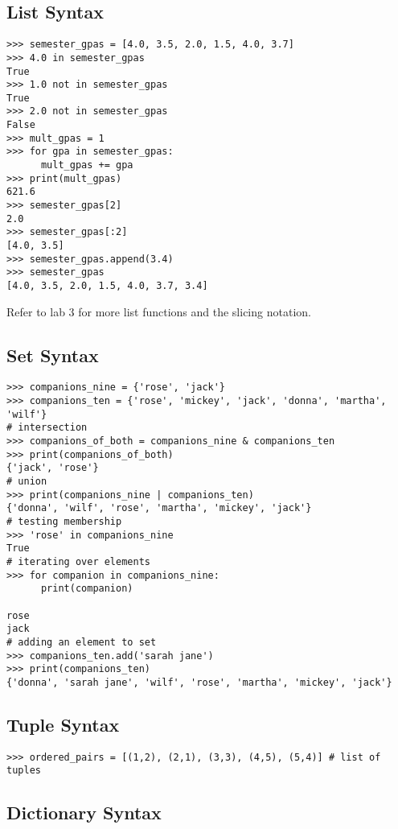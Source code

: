 \documentclass[11pt]{cselabheader}
\begin{document}
\subsection{List Syntax}

\begin{lstlisting}[style=ipython]
>>> semester_gpas = [4.0, 3.5, 2.0, 1.5, 4.0, 3.7]
>>> 4.0 in semester_gpas
True
>>> 1.0 not in semester_gpas
True
>>> 2.0 not in semester_gpas
False
>>> mult_gpas = 1
>>> for gpa in semester_gpas:
      mult_gpas += gpa
>>> print(mult_gpas)
621.6
>>> semester_gpas[2]
2.0
>>> semester_gpas[:2]
[4.0, 3.5]
>>> semester_gpas.append(3.4)
>>> semester_gpas
[4.0, 3.5, 2.0, 1.5, 4.0, 3.7, 3.4]
\end{lstlisting}

Refer to lab 3 for more list functions and the slicing notation.

\subsection{Set Syntax}

\begin{lstlisting}[style=ipython]
>>> companions_nine = {'rose', 'jack'}
>>> companions_ten = {'rose', 'mickey', 'jack', 'donna', 'martha', 'wilf'}
# intersection
>>> companions_of_both = companions_nine & companions_ten
>>> print(companions_of_both)
{'jack', 'rose'}
# union
>>> print(companions_nine | companions_ten)
{'donna', 'wilf', 'rose', 'martha', 'mickey', 'jack'}
# testing membership
>>> 'rose' in companions_nine
True
# iterating over elements
>>> for companion in companions_nine:
      print(companion)

rose
jack
# adding an element to set
>>> companions_ten.add('sarah jane')
>>> print(companions_ten)
{'donna', 'sarah jane', 'wilf', 'rose', 'martha', 'mickey', 'jack'}
\end{lstlisting}

\subsection{Tuple Syntax}

\begin{lstlisting}[style=ipython]
>>> ordered_pairs = [(1,2), (2,1), (3,3), (4,5), (5,4)] # list of tuples
\end{lstlisting}

\subsection{Dictionary Syntax}
\end{document}
